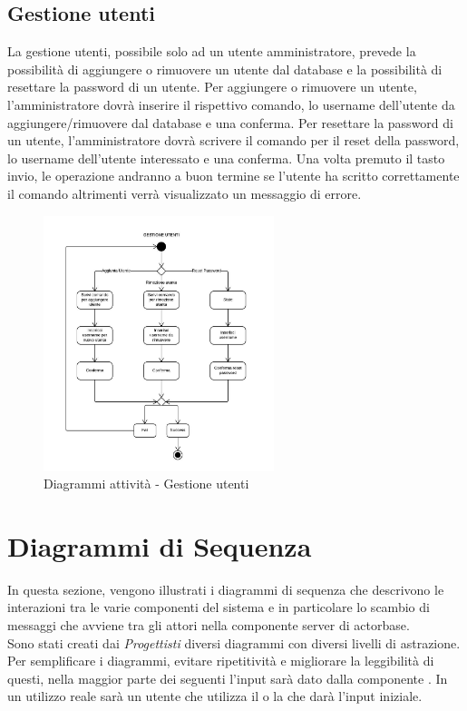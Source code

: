 \documentclass{scalatekids-article}
\begin{document}
\subsection{Gestione utenti}

La gestione utenti, possibile solo ad un utente amministratore, prevede la
possibilità di aggiungere o rimuovere un utente dal database e la possibilità
di resettare la password di un utente. Per aggiungere o rimuovere un utente,
l'amministratore dovrà inserire il rispettivo comando, lo username dell'utente
da aggiungere/rimuovere dal database e una conferma. Per resettare la password
di un utente, l'amministratore dovrà scrivere il comando per il reset della
password, lo username dell'utente interessato e una conferma. Una volta
premuto il tasto invio, le operazione andranno a buon termine se l'utente ha
scritto correttamente il comando altrimenti verrà visualizzato un messaggio di
errore.

\begin{figure}[H]
  \begin{center}
    \includegraphics[width=0.6\textwidth, keepaspectratio]{img/diagrammiAttivita/gestioneUtenti.jpeg}
    \caption{Diagrammi attività - Gestione utenti}
  \end{center}
\end{figure}

\section{Diagrammi di Sequenza}

In questa sezione, vengono illustrati i diagrammi di sequenza che descrivono 
le interazioni tra le varie componenti del sistema e in particolare lo scambio 
di messaggi che avviene tra gli attori nella componente server di actorbase.\\
Sono stati creati dai \textit{Progettisti} diversi diagrammi con diversi livelli 
di astrazione.\\
Per semplificare i diagrammi, evitare ripetitività e migliorare la leggibilità di 
questi, nella maggior parte dei seguenti l'input sarà dato dalla componente . In un utilizzo reale sarà un utente che utilizza il  o la 
 che darà l'input iniziale.
\end{document}
